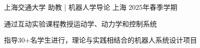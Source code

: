 
\vspace{-7mm}

\begin{cventries}
    \cventry
    {上海交通大学} %
    {助教 | 机器人学导论} %
    {上海} %
    {2025年春季学期} %
    {
        \vspace{-5mm}
        \begin{cvitems}
            \item{通过互动实验课程教授运动学、动力学和控制系统}
            \item{指导30+名学生进行，理论与实践相结合的机器人系统设计项目}
        \end{cvitems}
        \vspace{5mm}
    }
\end{cventries}